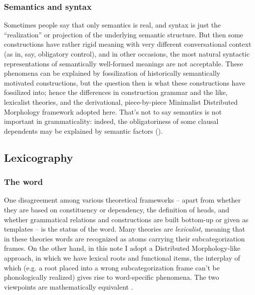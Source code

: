 \documentclass[UTF8, a4paper, oneside, scheme=plain, 12pt]{ctexbook}
\begin{document}
{\subsubsection{Semantics and syntax}

Sometimes people say that only semantics is real, 
and syntax is just the ``realization'' or projection of the underlying semantic structure.
But then some constructions have rather rigid meaning with very different conversational context 
(as in, say, obligatory control), 
and in other occasions, the most natural syntactic representations
of semantically well-formed meanings are not acceptable.
These phenomena can be explained by fossilization of historically semantically motivated constructions, 
but the question then is what these constructions have fossilized into; 
hence the differences in construction grammar and the like, 
lexicalist theories, and the derivational, piece-by-piece Minimalist Distributed Morphology framework adopted here.
That's not to say semantics is not important in grammaticality: 
indeed, the obligatoriness of some clausal dependents 
may be explained by semantic factors ().

\subsection{Lexicography}

\subsubsection{The word}\label{sec:theory.word}

One disagreement among various theoretical frameworks 
-- apart from whether they are based on constituency or dependency,
the definition of heads,
and whether grammatical relations and constructions are built bottom-up or given as templates --
is the status of the word.
Many theories are \emph{lexicalist}, 
meaning that in these theories words are recognized as atoms carrying their subcategorization frames.
On the other hand, in this note I adopt a Distributed Morphology-like approach,
in which we have lexical roots and functional items,
the interplay of which 
(e.g. a root placed into a wrong subcategorization frame can't be phonologically realized) 
gives rise to word-specific phenomena.
The two viewpoints are mathematically equivalent \citep{kobele2011minimalist}.

}
\end{document}
